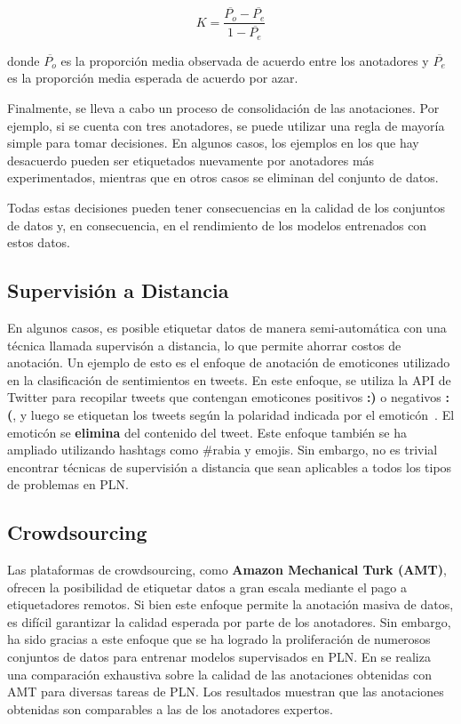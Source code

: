 \[
K = \frac{\overline{P_o} - \overline{P_e}}{1 - \overline{P_e}}
\]

donde \(\overline{P_o}\) es la proporción media observada de acuerdo entre los anotadores y \(\overline{P_e}\) es la proporción media esperada de acuerdo por azar.

Finalmente, se lleva a cabo un proceso de consolidación de las anotaciones. Por ejemplo, si se cuenta con tres anotadores, se puede utilizar una regla de mayoría simple para tomar decisiones. En algunos casos, los ejemplos en los que hay desacuerdo pueden ser etiquetados nuevamente por anotadores más experimentados, mientras que en otros casos se eliminan del conjunto de datos.

Todas estas decisiones pueden tener consecuencias en la calidad de los conjuntos de datos y, en consecuencia, en el rendimiento de los modelos entrenados con estos datos.


\subsection{Supervisión a Distancia}

En algunos casos, es posible etiquetar datos de manera semi-automática con una técnica llamada supervisón a distancia, lo que permite ahorrar costos de anotación. Un ejemplo de esto es el enfoque de anotación de emoticones utilizado en la clasificación de sentimientos en tweets. En este enfoque, se utiliza la API de Twitter para recopilar tweets que contengan emoticones positivos \textcolor[rgb]{0.00,0.00,1.00}{\textbf{:)}} o negativos \textcolor[rgb]{1.00,0.00,0.00}{\textbf{:(}}, y luego se etiquetan los tweets según la polaridad indicada por el emoticón~\cite{Read2005}. El emoticón se \textbf{elimina} del contenido del tweet. Este enfoque también se ha ampliado utilizando hashtags como \#rabia y emojis. Sin embargo, no es trivial encontrar técnicas de supervisión a distancia que sean aplicables a todos los tipos de problemas en PLN.

\subsection{Crowdsourcing}
Las plataformas de crowdsourcing, como \textbf{Amazon Mechanical Turk (AMT)}, ofrecen la posibilidad de etiquetar datos a gran escala mediante el pago a etiquetadores remotos. Si bien este enfoque permite la anotación masiva de datos, es difícil garantizar la calidad esperada por parte de los anotadores. Sin embargo, ha sido gracias a este enfoque que se ha logrado la proliferación de numerosos conjuntos de datos para entrenar modelos supervisados en PLN. En \cite{snow2008cheap} se realiza una comparación exhaustiva sobre la calidad de las anotaciones obtenidas con AMT para diversas tareas de PLN.  Los resultados muestran que las anotaciones obtenidas son comparables a las de los anotadores expertos. 

